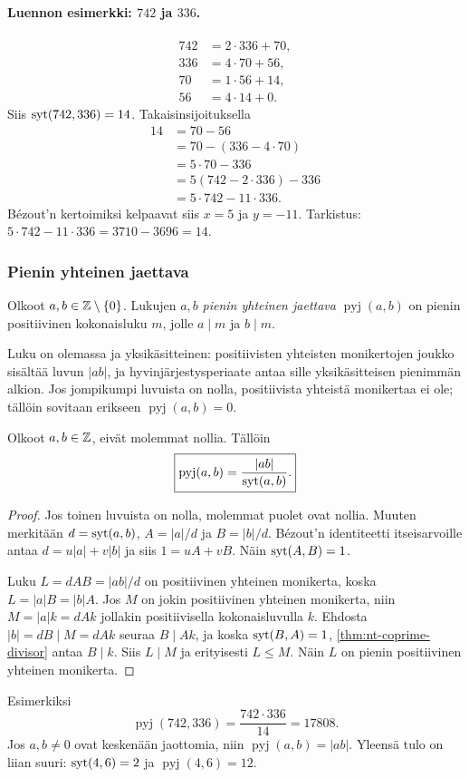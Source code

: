 \documentclass[11pt,a4paper]{amsart}
\begin{document}
\paragraph{Luennon esimerkki: $742$ ja $336$.}
\[
  \begin{aligned}
    742&=2\cdot336+70,\\
    336&=4\cdot70+56,\\
    70&=1\cdot56+14,\\
    56&=4\cdot14+0.
  \end{aligned}
\]
Siis $\operatorname{syt}(742,336)=14$. Takaisinsijoituksella
\[
  \begin{aligned}
    14&=70-56\\
    &=70-(336-4\cdot70)\\
    &=5\cdot70-336\\
    &=5(742-2\cdot336)-336\\
    &=5\cdot742-11\cdot336.
  \end{aligned}
\]
Bézout'n kertoimiksi kelpaavat siis $x=5$ ja $y=-11$.
Tarkistus: $5\cdot742-11\cdot336=3710-3696=14$.

\subsubsection{Pienin yhteinen jaettava}
\begin{definition}
  Olkoot $a,b\in\mathbb{Z}\setminus\{0\}$. Lukujen $a,b$
  \emph{pienin yhteinen jaettava} $\operatorname{pyj}(a,b)$ on
  pienin positiivinen kokonaisluku $m$, jolle $a\mid m$ ja $b\mid m$.
\end{definition}
Luku on olemassa ja yksikäsitteinen: positiivisten yhteisten
monikertojen joukko sisältää luvun $|ab|$, ja hyvinjärjestysperiaate
antaa sille yksikäsitteisen pienimmän alkion.
Jos jompikumpi luvuista on nolla, positiivista yhteistä monikertaa
ei ole; tällöin sovitaan erikseen $\operatorname{pyj}(a,b)=0$.

\begin{theorem}
  Olkoot $a,b\in\mathbb{Z}$, eivät molemmat nollia. Tällöin
  \[
    \boxed{\operatorname{pyj}(a,b)=\frac{|ab|}{\operatorname{syt}(a,b)}.}
  \]
\end{theorem}
\begin{proof}
  Jos toinen luvuista on nolla, molemmat puolet ovat nollia.
  Muuten merkitään $d=\operatorname{syt}(a,b)$, $A=|a|/d$ ja $B=|b|/d$.
  Bézout'n identiteetti itseisarvoille antaa $d=u|a|+v|b|$ ja siis
  $1=uA+vB$. Näin $\operatorname{syt}(A,B)=1$.

  Luku $L=dAB=|ab|/d$ on positiivinen yhteinen monikerta, koska
  $L=|a|B=|b|A$. Jos $M$ on jokin positiivinen yhteinen monikerta,
  niin $M=|a|k=dAk$ jollakin positiivisella kokonaisluvulla $k$.
  Ehdosta $|b|=dB\mid M=dAk$ seuraa $B\mid Ak$, ja koska
  $\operatorname{syt}(B,A)=1$, \cref{thm:nt-coprime-divisor} antaa $B\mid k$.
  Siis $L\mid M$ ja erityisesti $L\le M$. Näin $L$ on pienin
  positiivinen yhteinen monikerta.
\end{proof}
Esimerkiksi
\[
  \operatorname{pyj}(742,336)=\frac{742\cdot336}{14}=17808.
\]
Jos $a,b\ne0$ ovat keskenään jaottomia, niin
$\operatorname{pyj}(a,b)=|ab|$. Yleensä tulo on liian suuri:
$\operatorname{syt}(4,6)=2$ ja $\operatorname{pyj}(4,6)=12$.
\end{document}
